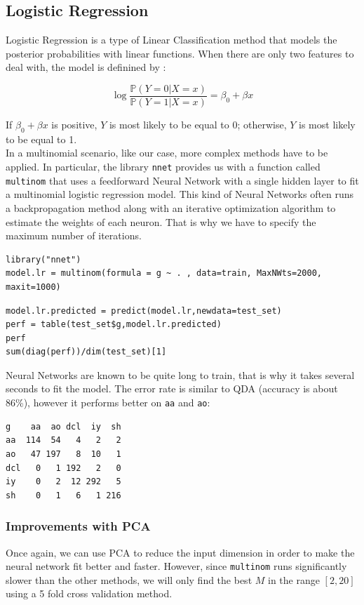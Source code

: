 \documentclass[]{report}
\begin{document}
\subsection{Logistic Regression}

Logistic Regression is a type of Linear Classification method that models the posterior probabilities with linear functions. When there are only two features to deal with, the model is definined by : 

$$
\log \frac{\mathbb{P}(Y = 0 | X = x)}{\mathbb{P}(Y = 1 | X = x)} = \beta_0 + \beta x
$$

If $\beta_0 + \beta x$ is positive, $Y$ is most likely to be equal to 0; otherwise, $Y$ is most likely to be equal to 1.  \\

In a multinomial scenario, like our case, more complex methods have to be applied. In particular, the library \texttt{nnet} provides us with a function called \texttt{multinom} that uses a feedforward Neural Network with a single hidden layer to fit a multinomial logistic regression model. This kind of Neural Networks often runs a backpropagation method along with an iterative optimization algorithm to estimate the weights of each neuron. That is why we have to specify the maximum number of iterations.

\begin{lstlisting}
library("nnet")
model.lr = multinom(formula = g ~ . , data=train, MaxNWts=2000, maxit=1000)
\end{lstlisting}

\begin{lstlisting}
model.lr.predicted = predict(model.lr,newdata=test_set)
perf = table(test_set$g,model.lr.predicted)
perf
sum(diag(perf))/dim(test_set)[1]
\end{lstlisting}

Neural Networks are known to be quite long to train, that is why it takes several seconds to fit the model. The error rate is similar to QDA (accuracy is about 86\%), however it performs better on \texttt{aa} and \texttt{ao}: 
\begin{verbatim}
g    aa  ao dcl  iy  sh
aa  114  54   4   2   2
ao   47 197   8  10   1
dcl   0   1 192   2   0
iy    0   2  12 292   5
sh    0   1   6   1 216
\end{verbatim}

\subsubsection{Improvements with PCA}
Once again, we can use PCA to reduce the input dimension in order to make the neural network fit better and faster. However, since \texttt{multinom} runs significantly slower than the other methods, we will only find the best $M$ in the range $[2, 20]$ using a 5 fold cross validation method.
\end{document}
